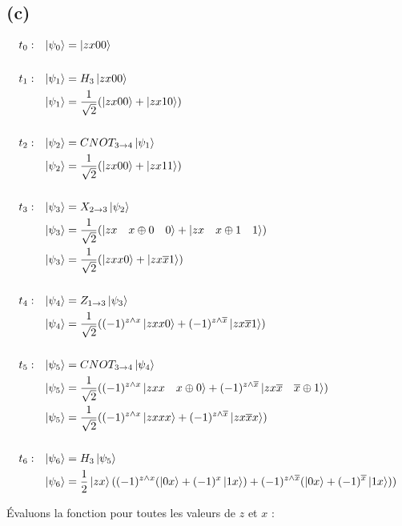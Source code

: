 \documentclass{article}
\begin{document}
\subsection*{(c)}
\begin{align*}
&t_0:&  \ket{\psi_0} &= \ket{zx00} \\ \\
&t_1:&  \ket{\psi_1} &= H_3\ket{zx00} \\
&&      \ket{\psi_1} &= \frac{1}{\sqrt{2}}(\ket{zx00} + \ket{zx10}) \\ \\
&t_2:&  \ket{\psi_2} &= CNOT_{3\rightarrow4}\ket{\psi_1} \\
&&      \ket{\psi_2} &= \frac{1}{\sqrt{2}}(\ket{zx00} + \ket{zx11}) \\ \\
&t_3:&  \ket{\psi_3} &= X_{2\rightarrow3}\ket{\psi_2} \\
&&      \ket{\psi_3} &= \frac{1}{\sqrt{2}}(\ket{zx \quad x \oplus 0 \quad 0} + \ket{zx \quad x \oplus 1 \quad 1}) \\
&&      \ket{\psi_3} &= \frac{1}{\sqrt{2}}(\ket{zxx0} + \ket{zx\overline{x}1}) \\ \\
&t_4:&  \ket{\psi_4} &= Z_{1\rightarrow3}\ket{\psi_3} \\
&&      \ket{\psi_4} &= \frac{1}{\sqrt{2}}((-1)^{z \wedge x}\ket{zxx0} + (-1)^{z \wedge \overline{x}}\ket{zx\overline{x}1}) \\ \\
&t_5:&  \ket{\psi_5} &= CNOT_{3 \rightarrow 4}\ket{\psi_4} \\
&&      \ket{\psi_5} &= \frac{1}{\sqrt{2}}((-1)^{z \wedge x}\ket{zxx \quad x \oplus 0} + (-1)^{z \wedge \overline{x}}\ket{zx\overline{x} \quad \overline{x} \oplus 1}) \\
&&      \ket{\psi_5} &= \frac{1}{\sqrt{2}}((-1)^{z \wedge x}\ket{zxxx} + (-1)^{z \wedge \overline{x}}\ket{zx\overline{x}x}) \\ \\
&t_6:&  \ket{\psi_6} &= H_3\ket{\psi_5} \\
&&      \ket{\psi_6} &= \frac{1}{2}\ket{zx}((-1)^{z \wedge x}(\ket{0x} + (-1)^x \ket{1x}) + (-1)^{z \wedge \overline{x}}(\ket{0x} + (-1)^{\overline{x}} \ket{1x}))
\end{align*}
\newpage
\begin{flushleft}
    Évaluons la fonction pour toutes les valeurs de $z$ et $x$ :
\end{flushleft}
\end{document}
